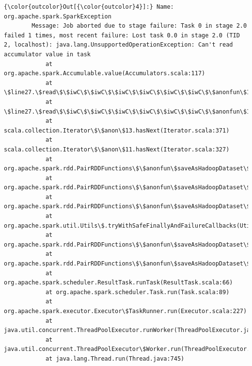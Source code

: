 \documentclass[11pt]{article}
\begin{document}
            \begin{Verbatim}[commandchars=\\\{\}]
{\color{outcolor}Out[{\color{outcolor}4}]:} Name: org.apache.spark.SparkException
        Message: Job aborted due to stage failure: Task 0 in stage 2.0 failed 1 times, most recent failure: Lost task 0.0 in stage 2.0 (TID 2, localhost): java.lang.UnsupportedOperationException: Can't read accumulator value in task
        	at org.apache.spark.Accumulable.value(Accumulators.scala:117)
        	at \$line27.\$read\$\$iwC\$\$iwC\$\$iwC\$\$iwC\$\$iwC\$\$iwC\$\$anonfun\$1.apply(<console>:31)
        	at \$line27.\$read\$\$iwC\$\$iwC\$\$iwC\$\$iwC\$\$iwC\$\$iwC\$\$anonfun\$1.apply(<console>:28)
        	at scala.collection.Iterator\$\$anon\$13.hasNext(Iterator.scala:371)
        	at scala.collection.Iterator\$\$anon\$11.hasNext(Iterator.scala:327)
        	at org.apache.spark.rdd.PairRDDFunctions\$\$anonfun\$saveAsHadoopDataset\$1\$\$anonfun\$13\$\$anonfun\$apply\$7.apply\$mcV\$sp(PairRDDFunctions.scala:1195)
        	at org.apache.spark.rdd.PairRDDFunctions\$\$anonfun\$saveAsHadoopDataset\$1\$\$anonfun\$13\$\$anonfun\$apply\$7.apply(PairRDDFunctions.scala:1195)
        	at org.apache.spark.rdd.PairRDDFunctions\$\$anonfun\$saveAsHadoopDataset\$1\$\$anonfun\$13\$\$anonfun\$apply\$7.apply(PairRDDFunctions.scala:1195)
        	at org.apache.spark.util.Utils\$.tryWithSafeFinallyAndFailureCallbacks(Utils.scala:1277)
        	at org.apache.spark.rdd.PairRDDFunctions\$\$anonfun\$saveAsHadoopDataset\$1\$\$anonfun\$13.apply(PairRDDFunctions.scala:1203)
        	at org.apache.spark.rdd.PairRDDFunctions\$\$anonfun\$saveAsHadoopDataset\$1\$\$anonfun\$13.apply(PairRDDFunctions.scala:1183)
        	at org.apache.spark.scheduler.ResultTask.runTask(ResultTask.scala:66)
        	at org.apache.spark.scheduler.Task.run(Task.scala:89)
        	at org.apache.spark.executor.Executor\$TaskRunner.run(Executor.scala:227)
        	at java.util.concurrent.ThreadPoolExecutor.runWorker(ThreadPoolExecutor.java:1142)
        	at java.util.concurrent.ThreadPoolExecutor\$Worker.run(ThreadPoolExecutor.java:617)
        	at java.lang.Thread.run(Thread.java:745)
        

\end{Verbatim}
\end{document}

